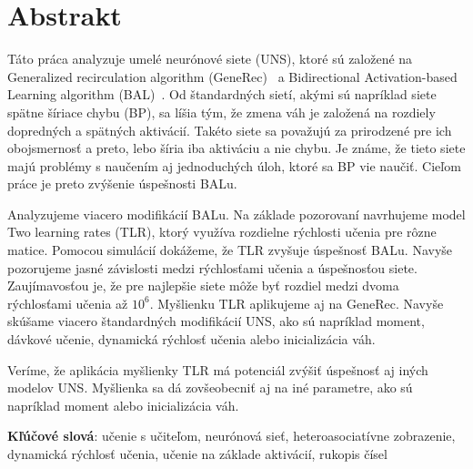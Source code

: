 
\section*{Abstrakt}

Táto práca analyzuje umelé neurónové siete (UNS), ktoré sú založené na Generalized recirculation algorithm (GeneRec)~\citep{o1996bio} a Bidirectional Activation-based Learning algorithm (BAL)~\citep{farkas2013bal}. Od štandardných sietí, akými sú napríklad siete spätne šíriace chybu (BP), sa líšia tým, že zmena váh je založená na rozdiely dopredných a spätných aktivácií. Takéto siete sa považujú za prirodzené pre ich obojsmernosť a preto, lebo šíria iba aktiváciu a nie chybu. Je známe, že tieto siete majú problémy s naučením aj jednoduchých úloh, ktoré sa BP vie naučiť. Cieľom práce je preto zvýšenie úspešnosti BALu. 

Analyzujeme viacero modifikácií BALu. Na základe pozorovaní navrhujeme model Two learning rates (TLR), ktorý využíva rozdielne rýchlosti učenia pre rôzne matice. Pomocou simulácií dokážeme, že TLR zvyšuje úspešnosť BALu. Navyše pozorujeme jasné závislosti medzi rýchlosťami učenia a úspešnosťou siete. Zaujímavosťou je, že pre najlepšie siete môže byť rozdiel medzi dvoma rýchlosťami učenia až $10^6$. Myšlienku TLR aplikujeme aj na GeneRec. Navyše skúšame viacero štandardných modifikácií UNS, ako sú napríklad moment, dávkové učenie, dynamická rýchlosť učenia alebo inicializácia váh. 

Veríme, že aplikácia myšlienky TLR má potenciál zvýšiť úspešnosť aj iných modelov UNS. Myšlienka sa dá zovšeobecniť aj na iné parametre, ako sú napríklad moment alebo inicializácia váh. 

\begin{flushleft}
  {\bf Kľúčové slová}: učenie s učiteľom, neurónová sieť, heteroasociatívne zobrazenie, dynamická rýchlosť učenia, učenie na základe aktivácií, rukopis čísel
\end{flushleft}

